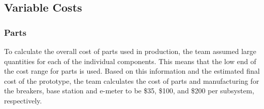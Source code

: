 \subsection{Variable Costs}
\subsubsection{Parts}
To calculate the overall cost of parts used in production, the team assumed large quantities for each of the individual components. This means that the low end of the cost range for parts is used. Based on this information and the estimated final cost of the prototype, the team calculates the cost of parts and manufacturing for the breakers, base station and e-meter to be \$35, \$100, and \$200 per subsystem, respectively.




